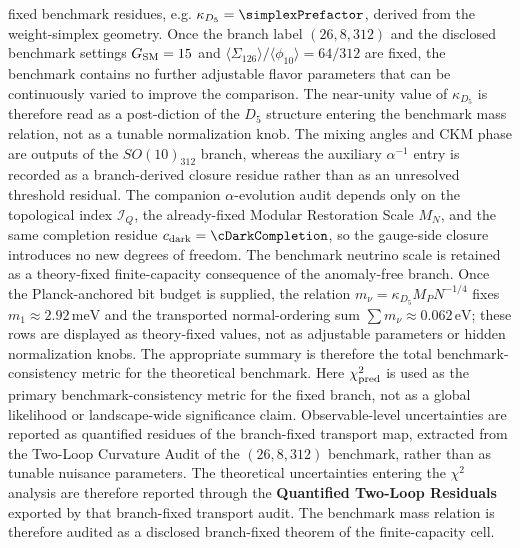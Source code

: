 \documentclass[11pt]{article}
\begin{document}
fixed benchmark residues, e.g. $\kappa_{D_5}=\simplexPrefactor$, derived from the weight-simplex geometry. Once the branch label $(26,8,312)$ and the disclosed benchmark settings $G_{\rm SM}=15$ and $\langle \Sigma_{126}\rangle/\langle\phi_{10}\rangle=64/312$ are fixed, the benchmark contains no further adjustable flavor parameters that can be continuously varied to improve the comparison. The near-unity value of $\kappa_{D_5}$ is therefore read as a post-diction of the $D_5$ structure entering the benchmark mass relation, not as a tunable normalization knob. The mixing angles and CKM phase are outputs of the $SO(10)_{312}$ branch, whereas the auxiliary $\alpha^{-1}$ entry is recorded as a branch-derived closure residue rather than as an unresolved threshold residual. The companion $\alpha$-evolution audit depends only on the topological index $\mathcal I_Q$, the already-fixed Modular Restoration Scale $M_N$, and the same completion residue $c_{\rm dark}=\cDarkCompletion$, so the gauge-side closure introduces no new degrees of freedom. The benchmark neutrino scale is retained as a theory-fixed finite-capacity consequence of the anomaly-free branch. Once the Planck-anchored bit budget is supplied, the relation $m_\nu=\kappa_{D_5}M_PN^{-1/4}$ fixes $m_1\approx2.92\,\mathrm{meV}$ and the transported normal-ordering sum $\sum m_\nu\approx0.062\,\mathrm{eV}$; these rows are displayed as theory-fixed values, not as adjustable parameters or hidden normalization knobs. The appropriate summary is therefore the total benchmark-consistency metric for the theoretical benchmark. Here $\chi_{\rm pred}^2$ is used as the primary benchmark-consistency metric for the fixed branch, not as a global likelihood or landscape-wide significance claim. Observable-level uncertainties are reported as quantified residues of the branch-fixed transport map, extracted from the Two-Loop Curvature Audit of the $(26,8,312)$ benchmark, rather than as tunable nuisance parameters. The theoretical uncertainties entering the $\chi^2$ analysis are therefore reported through the \textbf{Quantified Two-Loop Residuals} exported by that branch-fixed transport audit. The benchmark mass relation is therefore audited as a disclosed branch-fixed theorem of the finite-capacity cell. %
\end{document}
